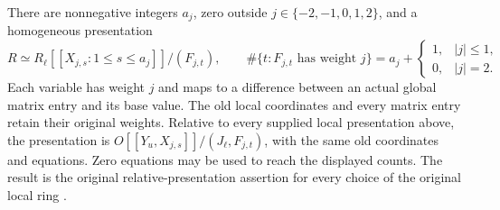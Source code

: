 \begin{theorem}
\label{thm:support-relative-presentation}
There are nonnegative integers $a_j$, zero outside
$j\in\{-2,-1,0,1,2\}$, and a homogeneous presentation
\[
 R\simeq
 R_\ell[[X_{j,s}:1\le s\le a_j]]/(F_{j,t}),
 \qquad
 \#\{t:F_{j,t}\text{ has weight }j\}
       =a_j+\begin{cases}1,&|j|\le1,\\0,&|j|=2.\end{cases}
                                                               \tag{RP2}
\]
Each variable has weight $j$ and maps to a difference between an
actual global matrix entry and its base value.  The old local
coordinates and every matrix entry retain their original weights.
Relative to every supplied local presentation above, the presentation
is $O[[Y_u,X_{j,s}]]/(J_\ell,F_{j,t})$, with the same old
coordinates and equations.
Zero equations may be used to reach the displayed counts.  The
result is the original relative-presentation assertion for every
choice of the original local ring \cite{support-relative-presentation-source}.
\end{theorem}

